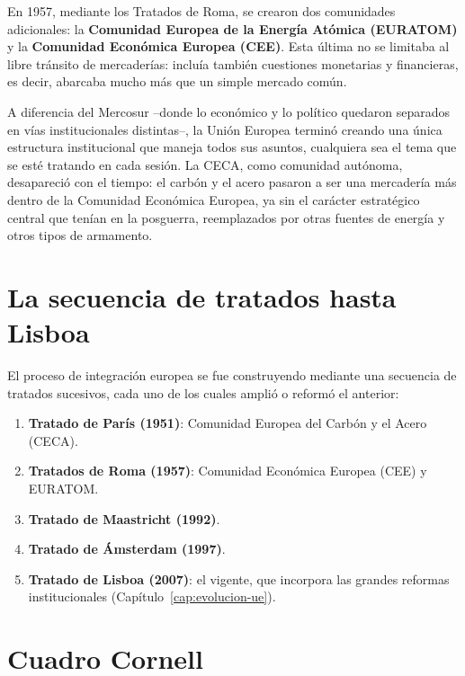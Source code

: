 \documentclass[12pt,oneside]{book}
\begin{document}
En 1957, mediante los Tratados de Roma, se crearon dos comunidades adicionales: la \textbf{Comunidad Europea de la Energía Atómica (EURATOM)} y la \textbf{Comunidad Económica Europea (CEE)}. Esta última no se limitaba al libre tránsito de mercaderías: incluía también cuestiones monetarias y financieras, es decir, abarcaba mucho más que un simple mercado común.

A diferencia del Mercosur --donde lo económico y lo político quedaron separados en vías institucionales distintas--, la Unión Europea terminó creando una única estructura institucional que maneja todos sus asuntos, cualquiera sea el tema que se esté tratando en cada sesión. La CECA, como comunidad autónoma, desapareció con el tiempo: el carbón y el acero pasaron a ser una mercadería más dentro de la Comunidad Económica Europea, ya sin el carácter estratégico central que tenían en la posguerra, reemplazados por otras fuentes de energía y otros tipos de armamento.

\section{La secuencia de tratados hasta Lisboa}

El proceso de integración europea se fue construyendo mediante una secuencia de tratados sucesivos, cada uno de los cuales amplió o reformó el anterior:

\begin{enumerate}
    \item \textbf{Tratado de París (1951)}: Comunidad Europea del Carbón y el Acero (CECA).
    \item \textbf{Tratados de Roma (1957)}: Comunidad Económica Europea (CEE) y EURATOM.
    \item \textbf{Tratado de Maastricht (1992)}.
    \item \textbf{Tratado de Ámsterdam (1997)}.
    \item \textbf{Tratado de Lisboa (2007)}: el vigente, que incorpora las grandes reformas institucionales (Capítulo~\ref{cap:evolucion-ue}).
\end{enumerate}

\section{Cuadro Cornell}
\end{document}
